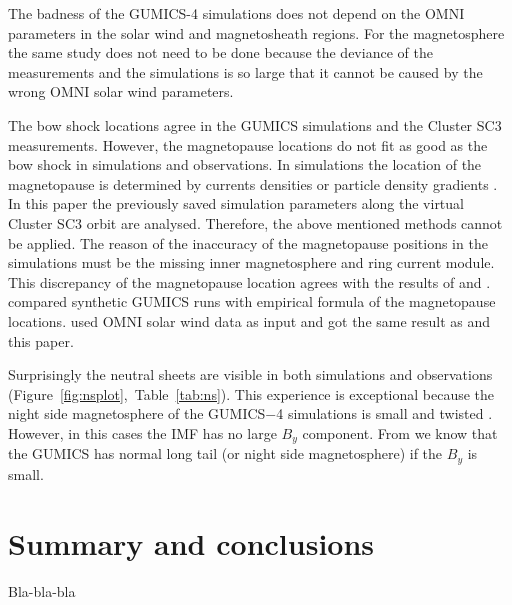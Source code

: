 \documentclass[linenumbers,draft]{agujournal}
\begin{document}

The badness of the GUMICS-4 simulations does not depend on the OMNI parameters in the solar wind and magnetosheath regions. For the magnetosphere the same study does not need to be done because the deviance of the measurements and the simulations is so large that it cannot be caused by the wrong OMNI solar wind parameters.


The bow shock locations agree in the GUMICS simulations and the Cluster SC3 measurements. However, the magnetopause locations do not fit as good as the bow shock in simulations and observations. In simulations the location of the magnetopause is determined by currents densities or particle density gradients \citep[][see references therein]{garcia07:_findin_lyon_fedder_mobar,gordeev13:_verif_gumic_mhd}. In this paper the previously saved simulation parameters along the virtual Cluster SC3 orbit are analysed. Therefore, the above mentioned methods cannot be applied. The reason of the inaccuracy of the magnetopause positions in the simulations must be the missing inner magnetosphere and ring current module. This discrepancy of the magnetopause location agrees with the results of \citet{gordeev13:_verif_gumic_mhd} and \citet{facsko16:_one_earth}. \citet{gordeev13:_verif_gumic_mhd} compared synthetic GUMICS runs with empirical formula of the magnetopause locations. \citet{facsko16:_one_earth} used OMNI solar wind data as input and got the same result as \citet{gordeev13:_verif_gumic_mhd} and this paper.

Surprisingly the neutral sheets are visible in both simulations and observations (Figure~\ref{fig:nsplot},~Table~\ref{tab:ns}). This experience is exceptional because the night side magnetosphere of the GUMICS$-$4 simulations is small and twisted \citep{gordeev13:_verif_gumic_mhd,facsko16:_one_earth}. However, in this cases the IMF has no large $B_{y}$ component. From \citet{facsko16:_one_earth} we know that the GUMICS has normal long tail (or night side magnetosphere) if the $B_{y}$ is small.

\section{Summary and conclusions}
\label{sec:concl}

Bla-bla-bla
\end{document}
